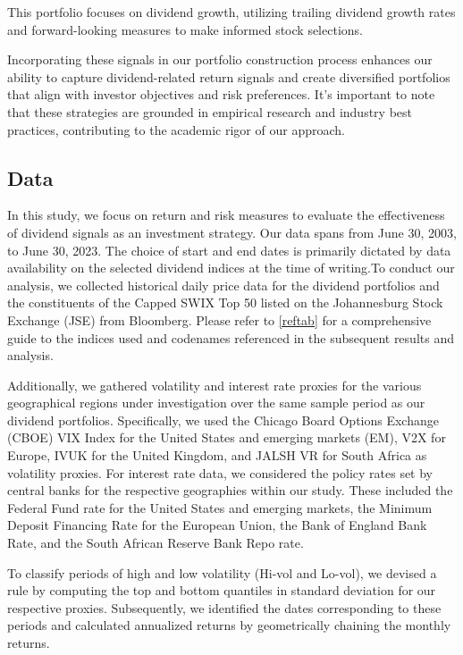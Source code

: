 \documentclass[11pt,preprint, authoryear]{elsarticle}
\numberwithin{equation}{section}
\numberwithin{figure}{section}
\numberwithin{table}{section}
\begin{document}
This portfolio focuses on dividend growth, utilizing trailing dividend
growth rates and forward-looking measures to make informed stock
selections.

Incorporating these signals in our portfolio construction process
enhances our ability to capture dividend-related return signals and
create diversified portfolios that align with investor objectives and
risk preferences. It's important to note that these strategies are
grounded in empirical research and industry best practices, contributing
to the academic rigor of our approach.

\hypertarget{data}{%
\subsection*{Data}\label{data}}

In this study, we focus on return and risk measures to evaluate the
effectiveness of dividend signals as an investment strategy. Our data
spans from June 30, 2003, to June 30, 2023. The choice of start and end
dates is primarily dictated by data availability on the selected
dividend indices at the time of writing.To conduct our analysis, we
collected historical daily price data for the dividend portfolios and
the constituents of the Capped SWIX Top 50 listed on the Johannesburg
Stock Exchange (JSE) from Bloomberg. Please refer to \ref{reftab} for a
comprehensive guide to the indices used and codenames referenced in the
subsequent results and analysis.

Additionally, we gathered volatility and interest rate proxies for the
various geographical regions under investigation over the same sample
period as our dividend portfolios. Specifically, we used the Chicago
Board Options Exchange (CBOE) VIX Index for the United States and
emerging markets (EM), V2X for Europe, IVUK for the United Kingdom, and
JALSH VR for South Africa as volatility proxies. For interest rate data,
we considered the policy rates set by central banks for the respective
geographies within our study. These included the Federal Fund rate for
the United States and emerging markets, the Minimum Deposit Financing
Rate for the European Union, the Bank of England Bank Rate, and the
South African Reserve Bank Repo rate.

To classify periods of high and low volatility (Hi-vol and Lo-vol), we
devised a rule by computing the top and bottom quantiles in standard
deviation for our respective proxies. Subsequently, we identified the
dates corresponding to these periods and calculated annualized returns
by geometrically chaining the monthly returns.
\end{document}
